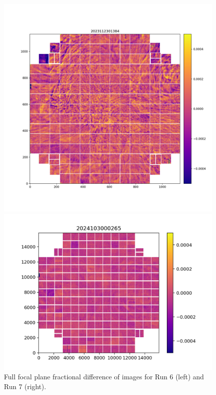 \begin{figure}[htbp]
\centering
\begin{minipage}{0.45\textwidth}
    \centering
    \includegraphics[width=\linewidth]{figures/Run6_Weather.png}
\end{minipage}
\begin{minipage}{0.5\textwidth}
    \centering
    \includegraphics[width=\linewidth]{figures/Run7_WeatherDiffuser.png}
\end{minipage}    
    \caption{Full focal plane fractional difference of images for Run 6 (left) and Run 7 (right).}

\label{fig:weather}
\end{figure}

